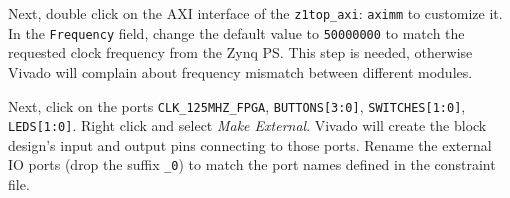 \documentclass[11pt]{article}
\begin{document}
\begin{appendices}
\begin{center}
\end{center}

Next, double click on the AXI interface of the \verb|z1top_axi|: \verb|aximm| to customize it. In the \texttt{Frequency} field, change the default value to \texttt{50000000} to match the requested clock frequency from the Zynq PS. This step is needed, otherwise Vivado will complain about frequency mismatch between different modules.

\begin{center}
\end{center}

Next, click on the ports \verb|CLK_125MHZ_FPGA|, \verb|BUTTONS[3:0]|, \verb|SWITCHES[1:0]|, \verb|LEDS[1:0]|. Right click and select \emph{Make External}. Vivado will create the block design's input and output pins connecting to those ports. Rename the external IO ports (drop the suffix \verb|_0|) to match the port names defined in the constraint file.


\end{appendices}
\end{document}
